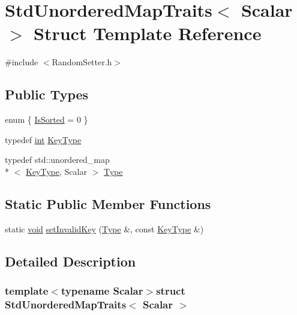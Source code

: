 \hypertarget{struct_std_unordered_map_traits}{\section{Std\-Unordered\-Map\-Traits$<$ Scalar $>$ Struct Template Reference}
\label{struct_std_unordered_map_traits}
}


{\ttfamily \#include $<$Random\-Setter.\-h$>$}

\subsection*{Public Types}
\begin{DoxyCompactItemize}
\item 
enum \{ \hyperlink{struct_std_unordered_map_traits_a039b7772642c7ab3b88d540140d4b8ebabb4b3e2c4b2074f6366f8e15e166a193}{Is\-Sorted} = 0
 \}
\item 
typedef \hyperlink{ioapi_8h_a787fa3cf048117ba7123753c1e74fcd6}{int} \hyperlink{struct_std_unordered_map_traits_ab5becfe9c547220362d1c68a2133593f}{Key\-Type}
\item 
typedef std\-::unordered\-\_\-map\\*
$<$ \hyperlink{struct_std_unordered_map_traits_ab5becfe9c547220362d1c68a2133593f}{Key\-Type}, Scalar $>$ \hyperlink{struct_std_unordered_map_traits_a343105e32275b2bdcce2260bc8b327c7}{Type}
\end{DoxyCompactItemize}
\subsection*{Static Public Member Functions}
\begin{DoxyCompactItemize}
\item 
static \hyperlink{group___u_a_v_objects_plugin_ga444cf2ff3f0ecbe028adce838d373f5c}{void} \hyperlink{struct_std_unordered_map_traits_a7cced5399533ef71260da107b06b9de7}{set\-Invalid\-Key} (\hyperlink{struct_std_unordered_map_traits_a343105e32275b2bdcce2260bc8b327c7}{Type} \&, const \hyperlink{struct_std_unordered_map_traits_ab5becfe9c547220362d1c68a2133593f}{Key\-Type} \&)
\end{DoxyCompactItemize}


\subsection{Detailed Description}
\subsubsection*{template$<$typename Scalar$>$struct Std\-Unordered\-Map\-Traits$<$ Scalar $>$}

